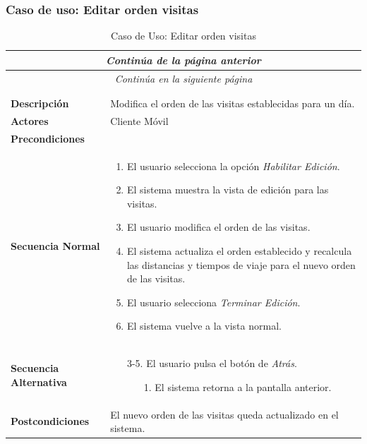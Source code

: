 \subsubsection*{Caso de uso: Editar orden visitas }
\begin{longtable}{| p{4cm} | p{10cm} |}
\endfirsthead
\multicolumn{2}{c}{\textit{Continúa de la página anterior}}\\[12pt]
\hline
\endhead
\hline
\multicolumn{2}{c}{\textit{Continúa en la siguiente página}} \\
\endfoot
\hline
\caption{Caso de Uso: Editar orden visitas}\label{fig:1}\\
\endlastfoot


\hline
\multicolumn{2}{|c|}{\textbf{CU$<$14$>$ - Editar Orden Visitas}} \\

\hline
\textbf{Descripción} &
Modifica el orden de las visitas establecidas para un día.\\

\hline
\textbf{Actores} &
Cliente Móvil\\

\hline
\textbf{Precondiciones} &
\\

\hline
\textbf{Secuencia Normal} &\mbox{}\par\vspace{-\baselineskip}
\begin{enumerate}[leftmargin=0.7cm, topsep=0.1cm]
\item El usuario selecciona la opción \textit{Habilitar Edición}.
\item El sistema muestra la vista de edición para las visitas.
\item El usuario modifica el orden de las visitas.
\item El sistema actualiza el orden establecido y recalcula las distancias y tiempos de viaje para el nuevo orden de las visitas.
\item El usuario selecciona \textit{Terminar Edición}.
\item El sistema vuelve a la vista normal.
\end{enumerate}


\\
\hline
\textbf{Secuencia Alternativa} &\mbox{}\par\vspace{-\baselineskip}
\begin{enumerate}[leftmargin=0.9cm, topsep=0.1cm]
\item[3-5.] El usuario pulsa el botón de \textit{Atrás}.
	\begin{itemize}
	\item[1.] El sistema retorna a la pantalla anterior.
	\end{itemize}
\end{enumerate}
\\

\hline
\textbf{Postcondiciones} & 
El nuevo orden de las visitas queda actualizado en el sistema.\\
\hline
\end{longtable}



